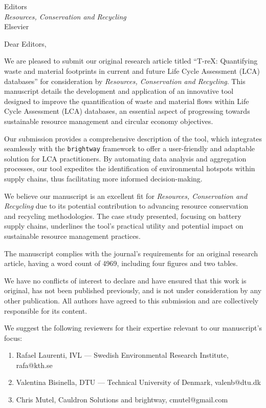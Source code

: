 \documentclass[10pt]{letter}
\begin{document}
\thispagestyle{empty}
\begin{letter}{Editors\\\textit{Resources, Conservation and Recycling}\\Elsevier}

    \opening{Dear Editors,}

    We are pleased to submit our original research article titled ``T-reX: Quantifying waste and material footprints in current and future Life Cycle Assessment (LCA) databases'' for consideration by \textit{Resources, Conservation and Recycling}. This manuscript details the development and application of an innovative tool designed to improve the quantification of waste and material flows within Life Cycle Assessment (LCA) databases, an essential aspect of progressing towards sustainable resource management and circular economy objectives.

    Our submission provides a comprehensive description of the tool, which integrates seamlessly with the \texttt{brightway} framework to offer a user-friendly and adaptable solution for LCA practitioners. By automating data analysis and aggregation processes, our tool expedites the identification of environmental hotspots within supply chains, thus facilitating more informed decision-making.

    We believe our manuscript is an excellent fit for \textit{Resources, Conservation and Recycling} due to its potential contribution to advancing resource conservation and recycling methodologies. The case study presented, focusing on battery supply chains, underlines the tool's practical utility and potential impact on sustainable resource management practices.

    The manuscript complies with the journal's requirements for an original research article, having a word count of 4969, including four figures and two tables.

    We have no conflicts of interest to declare and have ensured that this work is original, has not been published previously, and is not under consideration by any other publication. All authors have agreed to this submission and are collectively responsible for its content.

    \vspace{1em}

    We suggest the following reviewers for their expertise relevant to our manuscript's focus:

    \begin{enumerate}
        \item {Rafael Laurenti, IVL --- Swedish Environmental Research Institute, rafa@kth.se}
        \item {Valentina Bisinella,  DTU --- Technical University of Denmark, valenb@dtu.dk}
        \item {Chris Mutel, Cauldron Solutions and brightway, cmutel@gmail.com}
    \end{enumerate}
    \vspace{1em}


\end{letter}
\end{document}
